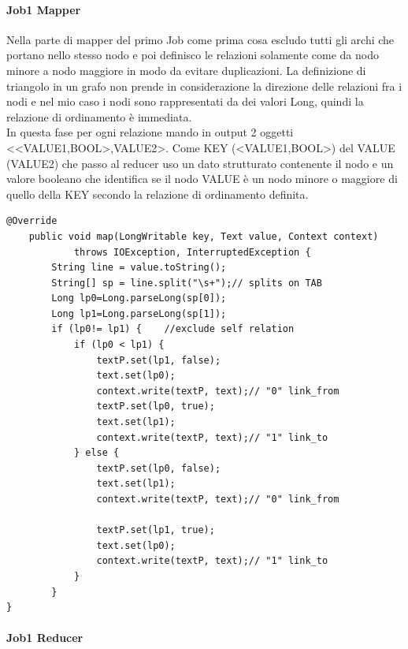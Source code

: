 \documentclass[paper=a4, fontsize=11pt]{scrartcl}	%
\numberwithin{equation}{section}															%
\numberwithin{figure}{section}																%
\numberwithin{table}{section}																%
\begin{document}
\paragraph{Job1 Mapper}
Nella parte di mapper del primo Job come prima cosa escludo tutti gli archi che portano nello stesso nodo e poi definisco le relazioni solamente come da nodo minore a nodo maggiore in modo da evitare duplicazioni. La definizione di triangolo in un grafo non prende in considerazione la direzione delle relazioni fra i nodi e nel mio caso i nodi sono rappresentati da dei valori Long, quindi la relazione di ordinamento è immediata.\\ 
In questa fase per ogni relazione mando in output 2 oggetti <<VALUE1,BOOL>,VALUE2>. Come KEY (<VALUE1,BOOL>) del VALUE (VALUE2) che passo al reducer uso un dato strutturato contenente il nodo e un valore booleano che identifica se il nodo VALUE è un nodo minore o maggiore di quello della KEY secondo la relazione di ordinamento definita. 

\begin{lstlisting}[label=Mapper1,caption=Implementazione del Mapper1]
@Override
	public void map(LongWritable key, Text value, Context context)
			throws IOException, InterruptedException {
		String line = value.toString();
		String[] sp = line.split("\s+");// splits on TAB
		Long lp0=Long.parseLong(sp[0]);
		Long lp1=Long.parseLong(sp[1]);
		if (lp0!= lp1) { 	//exclude self relation
			if (lp0 < lp1) {
				textP.set(lp1, false);
				text.set(lp0);
				context.write(textP, text);// "0" link_from
				textP.set(lp0, true);
				text.set(lp1);
				context.write(textP, text);// "1" link_to
			} else {
				textP.set(lp0, false);
				text.set(lp1);
				context.write(textP, text);// "0" link_from

				textP.set(lp1, true);
				text.set(lp0);
				context.write(textP, text);// "1" link_to
			}
		}
}\end{lstlisting}
\paragraph{Job1 Reducer}
\end{document}
